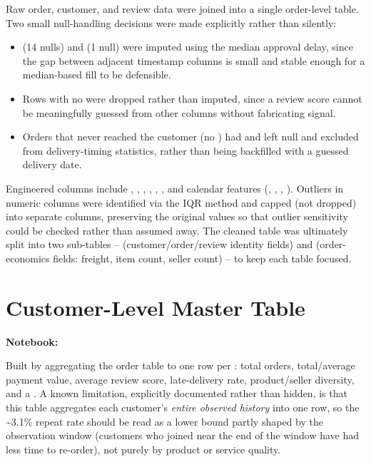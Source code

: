 \documentclass[11pt,a4paper]{report}
\begin{document}
Raw order, customer, and review data were joined into a single order-level table. Two small
null-handling decisions were made explicitly rather than silently:
\begin{itemize}
    \item {} (14 nulls) and 
        (1 null) were imputed using the median approval delay, since the gap between adjacent
        timestamp columns is small and stable enough for a median-based fill to be defensible.
    \item Rows with no  were dropped rather than imputed, since a review
        score cannot be meaningfully guessed from other columns without fabricating signal.
    \item Orders that never reached the customer (no )
        had  and  left null and
        excluded from delivery-timing statistics, rather than being backfilled with a guessed
        delivery date.
\end{itemize}

Engineered columns include , ,
, , ,
, and calendar features (,
, , ). Outliers in numeric
columns were identified via the IQR method and capped (not dropped) into separate
 columns, preserving the original values so that outlier sensitivity could be
checked rather than assumed away. The cleaned table was ultimately split into two
sub-tables --  (customer/order/review identity fields)
and  (order-economics fields: freight, item count,
seller count) -- to keep each table focused.

\section{Customer-Level Master Table}
\textbf{Notebook:} 

Built by aggregating the order table to one row per : total orders,
total/average payment value, average review score, late-delivery rate, product/seller diversity,
and a . A known limitation, explicitly documented rather than
hidden, is that this table aggregates each customer's \emph{entire observed history} into one row,
so the \textasciitilde3.1\% repeat rate should be read as a lower bound partly shaped by the
observation window (customers who joined near the end of the window have had less time to
re-order), not purely by product or service quality.
\end{document}
